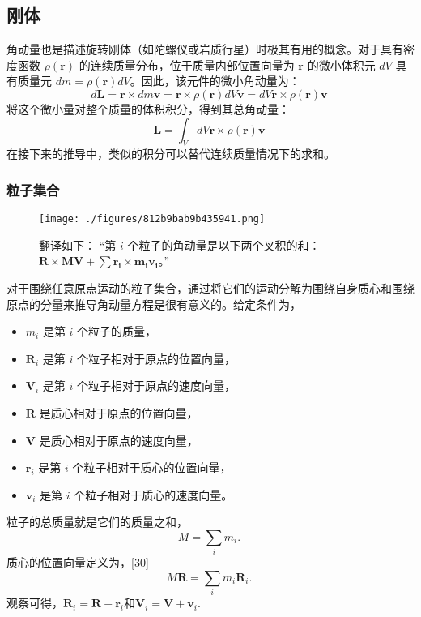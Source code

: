 \subsection{刚体}  
角动量也是描述旋转刚体（如陀螺仪或岩质行星）时极其有用的概念。对于具有密度函数 \(\rho(\mathbf{r})\) 的连续质量分布，位于质量内部位置向量为 \(\mathbf{r}\) 的微小体积元 \(dV\) 具有质量元 \(dm = \rho(\mathbf{r})dV\)。因此，该元件的微小角动量为：
\[
d\mathbf{L} = \mathbf{r} \times dm \mathbf{v} = \mathbf{r} \times \rho(\mathbf{r})dV \mathbf{v} = dV \mathbf{r} \times \rho(\mathbf{r}) \mathbf{v}~
\]
将这个微小量对整个质量的体积积分，得到其总角动量：
\[
\mathbf{L} = \int_{V} dV \mathbf{r} \times \rho(\mathbf{r}) \mathbf{v}~
\]
在接下来的推导中，类似的积分可以替代连续质量情况下的求和。 
\subsubsection{粒子集合}
\begin{figure}[ht]
\centering
\texttt{[image: ./figures/812b9bab9b435941.png]}
\caption{翻译如下：  “第 \(i\) 个粒子的角动量是以下两个叉积的和：\( \mathbf{R} \times \mathbf{MV} + \sum \mathbf{r_i} \times \mathbf{m_i v_i} \)。”} \label{fig_JDL_6}
\end{figure}
对于围绕任意原点运动的粒子集合，通过将它们的运动分解为围绕自身质心和围绕原点的分量来推导角动量方程是很有意义的。给定条件为，
\begin{itemize}
\item \({\displaystyle m_{i}}\) 是第 \(i\) 个粒子的质量， 
\item \({\displaystyle \mathbf {R}_{i}}\) 是第 \(i\) 个粒子相对于原点的位置向量， 
\item \({\displaystyle \mathbf {V}_{i}}\) 是第 \(i\) 个粒子相对于原点的速度向量，
\item \({\displaystyle \mathbf {R}}\) 是质心相对于原点的位置向量，
\item \({\displaystyle \mathbf {V}}\) 是质心相对于原点的速度向量， 
\item \({\displaystyle \mathbf {r}_{i}}\) 是第 \(i\) 个粒子相对于质心的位置向量， 
\item \({\displaystyle \mathbf {v}_{i}}\) 是第 \(i\) 个粒子相对于质心的速度向量。
\end{itemize}
粒子的总质量就是它们的质量之和，
\[
M = \sum_{i} m_{i}.~
\]
质心的位置向量定义为，[30]
\[
M \mathbf{R} = \sum_{i} m_{i} \mathbf{R}_{i}.~
\]
观察可得，\(\mathbf{R}_{i} = \mathbf{R} + \mathbf{r}_{i}\)和\(\mathbf{V}_{i} = \mathbf{V} + \mathbf{v}_{i}.\)

